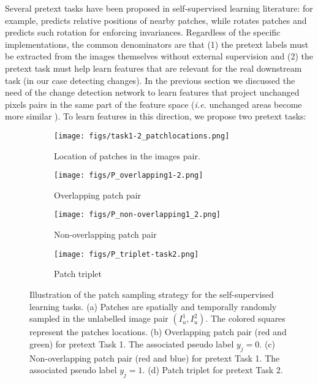 \documentclass[runningheads]{llncs}
\begin{document}
Several pretext tasks have been proposed in self-supervised learning literature{: for example, \cite{Doersch:2015:self-supervised_spatial_context}  predicts relative positions of nearby patches, while \cite{Gidaris:2018:self-supervised_rotation} rotates patches and predicts such rotation for enforcing invariances. Regardless of the specific implementations,} the common  denominators are that (1) the pretext labels must be extracted from the images themselves without external supervision and (2) the pretext task must help learn features that are relevant for the real downstream task (in our case detecting changes). In the previous section we discussed the need of the change detection network to learn features that project unchanged pixels pairs in the same part of the feature space (\emph{i.e.} unchanged areas become more similar \cite{Vol14b}).
To learn features in this direction, we propose two pretext tasks: 

\begin{figure}[!t]
\centering
\begin{subfigure}{0.9\textwidth}
\texttt{[image: figs/task1-2\_patchlocations.png]}
\caption{Location of patches in the images pair.}
\label{subfig:pretext_tasks_a}
\end{subfigure} 
\hfill

\begin{subfigure}{0.45\textwidth}
\texttt{[image: figs/P\_overlapping1-2.png]} 
\caption{Overlapping patch pair}
\label{subfig:pretext_tasks_b}
\end{subfigure}
\begin{subfigure}{0.45\textwidth}
\texttt{[image: figs/P\_non-overlapping1\_2.png]}
\caption{Non-overlapping patch pair}
\label{subfig:pretext_tasks_c}
\end{subfigure}

\begin{subfigure}{0.67\textwidth}
\texttt{[image: figs/P\_triplet-task2.png]}
\caption{Patch triplet}
\label{subfig:pretext_tasks_d}
\end{subfigure} 

\caption[Illustration of patch sampling strategy.]{Illustration of the patch sampling strategy for the self-supervised learning tasks. (a) Patches are spatially and temporally randomly sampled in the unlabelled image pair $(I_u^1, I_u^2)$. The colored squares represent the  patches locations. (b) Overlapping patch pair (red and green) for pretext Task 1. The associated pseudo label $y_{j} = 0$. (c) Non-overlapping patch pair (red and blue) for pretext Task 1. The associated pseudo label $y_{j} = 1$. (d) Patch triplet for pretext Task 2. 
} 
\label{fig:pretext_tasks}
\end{figure}
\end{document}
